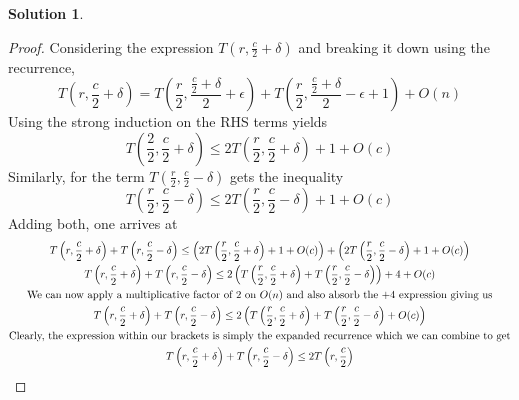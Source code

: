 \documentclass{article}
\theoremstyle{definition}
\newtheorem*{solution}{Solution}
\begin{document}
\begin{solution}
\begin{proof}
Considering the expression $T \left(r, \frac{c}{2} + \delta \right)$ and breaking it down using the recurrence, 
$$
T \left(r, \frac{c}{2} + \delta \right) = T\left(\frac{r}{2}, \frac{\frac{c}{2} + \delta}{2} + \epsilon \right) + T\left(\frac{r}{2}, \frac{\frac{c}{2} + \delta}{2} - \epsilon + 1 \right) + O(n)
$$
Using the strong induction on the RHS terms yields
$$
T \left(\frac{2}{2}, \frac{c}{2} + \delta \right) \leq 2T\left(\frac{r}{2}, \frac{c}{2} + \delta \right) + 1 + O(c)
$$
Similarly, for the term $T \left(\frac{r}{2}, \frac{c}{2} - \delta \right)$ gets the inequality
$$
T \left(\frac{r}{2}, \frac{c}{2} - \delta \right) \leq 2T\left(\frac{r}{2}, \frac{c}{2} - \delta \right) + 1 + O(c)
$$
Adding both, one arrives at 
\begin{gather*}
T \left(r, \frac{c}{2} + \delta \right) + T \left(r, \frac{c}{2} - \delta \right) \leq
\left(2T\left(\frac{r}{2}, \frac{c}{2} + \delta \right) + 1 + O(c)\right) + 
\left(2T\left(\frac{r}{2}, \frac{c}{2} - \delta \right) + 1 + O(c)\right) \\
T \left(r, \frac{c}{2} + \delta \right) + T \left(r, \frac{c}{2} - \delta \right) \leq 
2\left(
T\left(\frac{r}{2}, \frac{c}{2} + \delta \right) +
T\left(\frac{r}{2}, \frac{c}{2} - \delta \right)
\right) + 4 + O(c) \\
\text{We can now apply a multiplicative factor of $2$ on $O(n)$ and also absorb the $ + 4$ expression giving us} \\
T \left(r, \frac{c}{2} + \delta \right) + T \left(r, \frac{c}{2} - \delta \right) \leq 
2\left(
T\left(\frac{r}{2}, \frac{c}{2} + \delta \right) +
T\left(\frac{r}{2}, \frac{c}{2} - \delta \right) + O(c)
\right) \\
\text{Clearly, the expression within our brackets is simply the expanded recurrence which we can combine to get} \\
T \left(r, \frac{c}{2} + \delta \right) + T \left(r, \frac{c}{2} - \delta \right) \leq 
2T\left(r, \frac{c}{2}\right)
\end{gather*}
%
\end{proof}


\end{solution}
\end{document}
